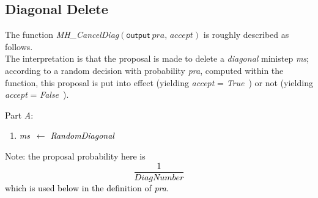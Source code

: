 \documentclass[a4paper,12pt,fleqn]{article}
\newcommand{\nnm}[1]{\textsf{\small\textit{#1}\ }}
\newcommand{\ms}{\textsl{\textsf{\small ms}}} %
\newcommand{\addaa}[1]{{\textcolor[named]{Black}{#1}}}  %
\begin{document}
\newpage
\subsection{Diagonal Delete}

The function
\textit{MH\_CancelDiag}$(%
\textsf{output}\ \textit{pra, accept})$
is roughly described as follows.\\
The interpretation is that
the proposal is made to delete a \textit{diagonal} ministep \ms;
according to a random decision with probability \textit{pra},
computed within the function,
this proposal is put into effect (yielding \textit{accept} = \nnm{True})
or not (yielding \textit{accept} = \nnm{False}).

\addaa{
Part \emph{A}:
\begin{enumerate}
\item \ms\ $ \leftarrow $ \textit{RandomDiagonal}
\end{enumerate}
Note: the proposal probability here is
\[
\frac{ 1 }{\textit{DiagNumber}}
\]
which is used below in the definition of \textit{pra}.
}
\end{document}
